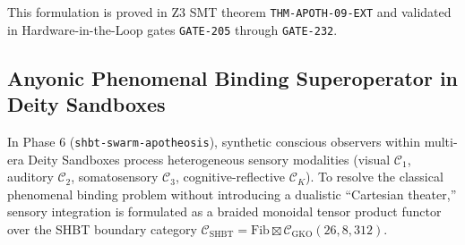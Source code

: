 \documentclass[11pt,onecolumn]{article}
\begin{document}
This formulation is proved in Z3 SMT theorem \texttt{THM-APOTH-09-EXT} and validated in Hardware-in-the-Loop gates \texttt{GATE-205} through \texttt{GATE-232}.

\FloatBarrier
\FloatBarrier
\subsection{Anyonic Phenomenal Binding Superoperator in Deity Sandboxes}
\label{sec:phenomenal_binding}

In Phase 6 (\texttt{shbt-swarm-apotheosis}), synthetic conscious observers within multi-era Deity Sandboxes process heterogeneous sensory modalities (visual $\mathcal{C}_1$, auditory $\mathcal{C}_2$, somatosensory $\mathcal{C}_3$, cognitive-reflective $\mathcal{C}_K$). To resolve the classical phenomenal binding problem without introducing a dualistic ``Cartesian theater,'' sensory integration is formulated as a braided monoidal tensor product functor over the SHBT boundary category $\mathcal{C}_{\mathrm{SHBT}} = \mathrm{Fib} \boxtimes \mathcal{C}_{\mathrm{GKO}}(26, 8, 312)$.
\end{document}
